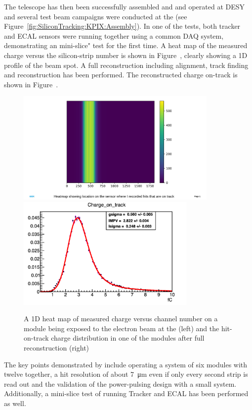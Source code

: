 The \LYCORIS telescope has then been successfully assembled and and operated at DESY and several test beam campaigns were conducted at the \DIITBF (see Figure~\ref{fig:SiliconTracking:KPIX:Assembly}). 
In one of the tests, both \SID tracker and \SID ECAL sensors were running together using a common DAQ system, demonstrating an \SID mini-slice" test for the first time. 
A heat map of the measured charge versus the silicon-strip number is shown in Figure~\label{fig:SiliconTracking:KPIX:Results}, clearly showing a 1D profile of the beam spot. 
A full reconstruction including alignment, track finding and reconstruction has been performed. The reconstructed charge on-track is shown in Figure~\label{fig:SiliconTracking:KPIX:Results}. 

\begin{figure}[htbp]
\includegraphics[height=5.5cm]{Tracker/KPIX/KPIX_heatmap_hitsOnTrack.pdf}
\includegraphics[height=5.5cm]{Tracker/KPIX/KPIX_signal_Landau_Run897.png}
\caption{A 1D heat map of measured charge versus channel number on a \LYCORIS module being exposed to the electron beam at the \DIITBF (left) and the hit-on-track charge distribution in 
one of the \LYCORIS modules after full reconstruction (right)}
\label{fig:SiliconTracking:KPIX:Results}
\end{figure}


The key points demonstrated by \LYCORIS include operating a system of six modules with twelve \KPIX together, 
a hit resolution of about \SI{7}{\micro\meter} even if only every second strip is read out and the 
validation of the power-pulsing design with a small system. Additionally, a mini-slice test of running \SiD Tracker and \SID ECAL has been performed as well. 


